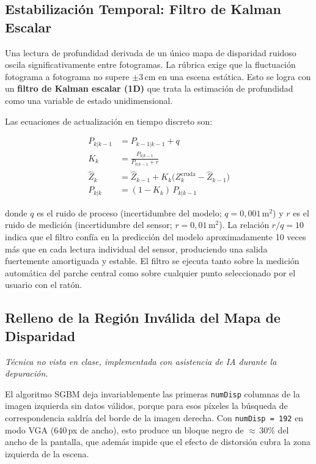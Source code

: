 \documentclass[12pt, a4paper]{article}
\begin{document}
\subsection{Estabilización Temporal: Filtro de Kalman Escalar}
\label{sec:kalman}

Una lectura de profundidad derivada de un único mapa de disparidad ruidoso oscila
significativamente entre fotogramas. La rúbrica exige que la fluctuación fotograma
a fotograma no supere $\pm3$\,cm en una escena estática. Esto se logra con un
\textbf{filtro de Kalman escalar (1D)} \cite{kalman1960new} que trata la estimación
de profundidad como una variable de estado unidimensional.

Las ecuaciones de actualización en tiempo discreto son:

\begin{align}
  P_{k|k-1}   &= P_{k-1|k-1} + q  \tag{Predicción: covarianza} \\
  K_k         &= \frac{P_{k|k-1}}{P_{k|k-1} + r}  \tag{Ganancia de Kalman} \\
  \hat{Z}_k   &= \hat{Z}_{k-1} + K_k \bigl(Z^{\text{cruda}}_k - \hat{Z}_{k-1}\bigr)  \tag{Actualización: estimado} \\
  P_{k|k}     &= (1 - K_k)\, P_{k|k-1}  \tag{Actualización: covarianza}
\end{align}

donde $q$ es el ruido de proceso (incertidumbre del modelo; $q = 0{,}001$\,m$^2$) y
$r$ es el ruido de medición (incertidumbre del sensor; $r = 0{,}01$\,m$^2$).
La relación $r/q = 10$ indica que el filtro confía en la predicción del modelo
aproximadamente 10 veces más que en cada lectura individual del sensor, produciendo
una salida fuertemente amortiguada y estable. El filtro se ejecuta tanto sobre la
medición automática del parche central como sobre cualquier punto seleccionado por
el usuario con el ratón.

\subsection{Relleno de la Región Inválida del Mapa de Disparidad}
\label{sec:disparityfill}

\emph{Técnica no vista en clase, implementada con asistencia de IA durante la depuración.}

El algoritmo SGBM deja invariablemente las primeras \texttt{numDisp} columnas de la
imagen izquierda sin datos válidos, porque para esos píxeles la búsqueda de
correspondencia saldría del borde de la imagen derecha. Con \texttt{numDisp\,=\,192}
en modo VGA (640\,px de ancho), esto produce un bloque negro de $\approx$\,30\% del
ancho de la pantalla, que además impide que el efecto de distorsión cubra la zona
izquierda de la escena.
\end{document}
